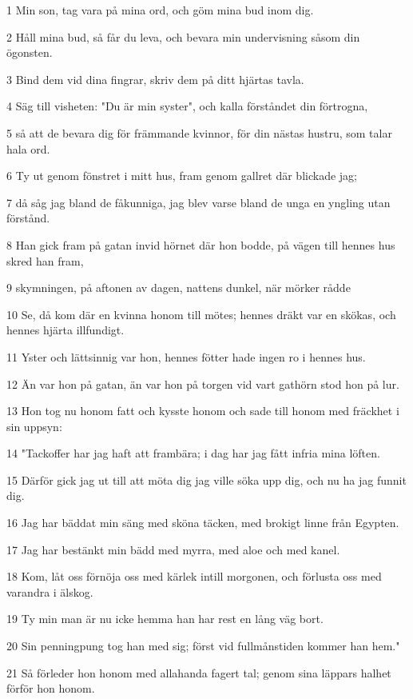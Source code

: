 \par 1 Min son, tag vara på mina ord, och göm mina bud inom dig.
\par 2 Håll mina bud, så får du leva, och bevara min undervisning såsom din ögonsten.
\par 3 Bind dem vid dina fingrar, skriv dem på ditt hjärtas tavla.
\par 4 Säg till visheten: "Du är min syster", och kalla förståndet din förtrogna,
\par 5 så att de bevara dig för främmande kvinnor, för din nästas hustru, som talar hala ord.
\par 6 Ty ut genom fönstret i mitt hus, fram genom gallret där blickade jag;
\par 7 då såg jag bland de fåkunniga, jag blev varse bland de unga en yngling utan förstånd.
\par 8 Han gick fram på gatan invid hörnet där hon bodde, på vägen till hennes hus skred han fram,
\par 9 skymningen, på aftonen av dagen, nattens dunkel, när mörker rådde
\par 10 Se, då kom där en kvinna honom till mötes; hennes dräkt var en skökas, och hennes hjärta illfundigt.
\par 11 Yster och lättsinnig var hon, hennes fötter hade ingen ro i hennes hus.
\par 12 Än var hon på gatan, än var hon på torgen vid vart gathörn stod hon på lur.
\par 13 Hon tog nu honom fatt och kysste honom och sade till honom med fräckhet i sin uppsyn:
\par 14 "Tackoffer har jag haft att frambära; i dag har jag fått infria mina löften.
\par 15 Därför gick jag ut till att möta dig jag ville söka upp dig, och nu ha jag funnit dig.
\par 16 Jag har bäddat min säng med sköna täcken, med brokigt linne från Egypten.
\par 17 Jag har bestänkt min bädd med myrra, med aloe och med kanel.
\par 18 Kom, låt oss förnöja oss med kärlek intill morgonen, och förlusta oss med varandra i älskog.
\par 19 Ty min man är nu icke hemma han har rest en lång väg bort.
\par 20 Sin penningpung tog han med sig; först vid fullmånstiden kommer han hem."
\par 21 Så förleder hon honom med allahanda fagert tal; genom sina läppars halhet förför hon honom.
